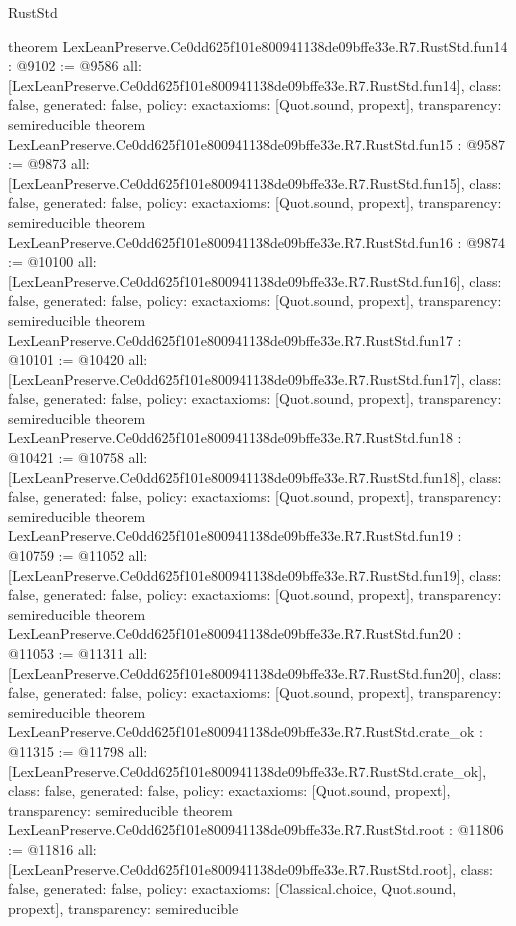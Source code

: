 \begin{lexlean}{RustStd}
\begin{coremodule}
{}
theorem LexLeanPreserve.Ce0dd625f101e800941138de09bffe33e.R7.RustStd.fun14 : @9102 := @9586 {
  all: [LexLeanPreserve.Ce0dd625f101e800941138de09bffe33e.R7.RustStd.fun14],
  class: false,
  generated: false,
  policy: exact{axioms: [Quot.sound, propext]},
  transparency: semireducible
}
theorem LexLeanPreserve.Ce0dd625f101e800941138de09bffe33e.R7.RustStd.fun15 : @9587 := @9873 {
  all: [LexLeanPreserve.Ce0dd625f101e800941138de09bffe33e.R7.RustStd.fun15],
  class: false,
  generated: false,
  policy: exact{axioms: [Quot.sound, propext]},
  transparency: semireducible
}
theorem LexLeanPreserve.Ce0dd625f101e800941138de09bffe33e.R7.RustStd.fun16 : @9874 := @10100 {
  all: [LexLeanPreserve.Ce0dd625f101e800941138de09bffe33e.R7.RustStd.fun16],
  class: false,
  generated: false,
  policy: exact{axioms: [Quot.sound, propext]},
  transparency: semireducible
}
theorem LexLeanPreserve.Ce0dd625f101e800941138de09bffe33e.R7.RustStd.fun17 : @10101 := @10420 {
  all: [LexLeanPreserve.Ce0dd625f101e800941138de09bffe33e.R7.RustStd.fun17],
  class: false,
  generated: false,
  policy: exact{axioms: [Quot.sound, propext]},
  transparency: semireducible
}
theorem LexLeanPreserve.Ce0dd625f101e800941138de09bffe33e.R7.RustStd.fun18 : @10421 := @10758 {
  all: [LexLeanPreserve.Ce0dd625f101e800941138de09bffe33e.R7.RustStd.fun18],
  class: false,
  generated: false,
  policy: exact{axioms: [Quot.sound, propext]},
  transparency: semireducible
}
theorem LexLeanPreserve.Ce0dd625f101e800941138de09bffe33e.R7.RustStd.fun19 : @10759 := @11052 {
  all: [LexLeanPreserve.Ce0dd625f101e800941138de09bffe33e.R7.RustStd.fun19],
  class: false,
  generated: false,
  policy: exact{axioms: [Quot.sound, propext]},
  transparency: semireducible
}
theorem LexLeanPreserve.Ce0dd625f101e800941138de09bffe33e.R7.RustStd.fun20 : @11053 := @11311 {
  all: [LexLeanPreserve.Ce0dd625f101e800941138de09bffe33e.R7.RustStd.fun20],
  class: false,
  generated: false,
  policy: exact{axioms: [Quot.sound, propext]},
  transparency: semireducible
}
theorem LexLeanPreserve.Ce0dd625f101e800941138de09bffe33e.R7.RustStd.crate_ok : @11315 := @11798 {
  all: [LexLeanPreserve.Ce0dd625f101e800941138de09bffe33e.R7.RustStd.crate_ok],
  class: false,
  generated: false,
  policy: exact{axioms: [Quot.sound, propext]},
  transparency: semireducible
}
theorem LexLeanPreserve.Ce0dd625f101e800941138de09bffe33e.R7.RustStd.root : @11806 := @11816 {
  all: [LexLeanPreserve.Ce0dd625f101e800941138de09bffe33e.R7.RustStd.root],
  class: false,
  generated: false,
  policy: exact{axioms: [Classical.choice, Quot.sound, propext]},
  transparency: semireducible
}


\end{coremodule}
\end{lexlean}
